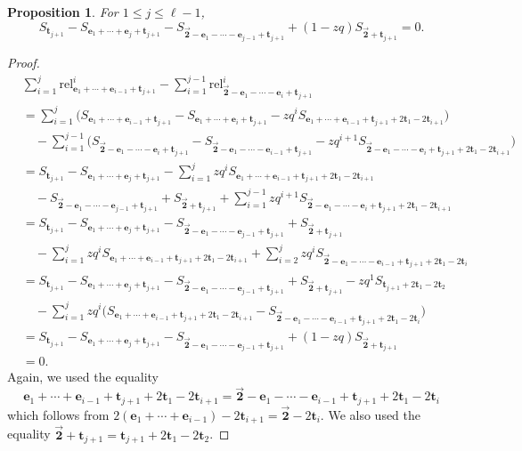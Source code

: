 \documentclass[pdftex]{sigma}
\numberwithin{equation}{section}
\newtheorem{Proposition}[Theorem]{Proposition}
\theoremstyle{definition}
\newcommand{\rel}{\text{rel}}
\newcommand{\tr}{\mathbf{t}}
\newcommand{\ee}{\mathbf{e}}
\newcommand{\two}{\vec{\mathbf{2}}}
\begin{document}
\begin{Proposition} \label{prop:comp2}
For $1 \le j \le \ell-1$,
\begin{equation*}
S_{\tr_{j+1}} -S_{\ee_1+\cdots+\ee_{j}+\tr_{j+1}}- S_{\two-\ee_1-\cdots-\ee_{j-1}+\tr_{j+1}} + (1-zq)S_{\two+\tr_{j+1}}=0.
\end{equation*}
\end{Proposition}
\begin{proof}
\begin{align*}
&\sum_{i=1}^j \rel^i_{\ee_1+\cdots+\ee_{i-1}+\tr_{j+1}} - \sum_{i=1}^{j-1}\rel^i_{\two-\ee_1-\cdots-\ee_i+\tr_{j+1}} \\
&=\sum_{i=1}^j \bigl( S_{\ee_1+\cdots+\ee_{i-1}+\tr_{j+1}} - S_{\ee_1+\cdots+\ee_{i}+\tr_{j+1}} - zq^{i} S_{\ee_1+\cdots+\ee_{i-1}+\tr_{j+1}+2\tr_1-2\tr_{i+1}}\bigr) \\
& \quad - \sum_{i=1}^{j-1}\bigl( S_{\two-\ee_1-\cdots-\ee_i+\tr_{j+1}} - S_{\two-\ee_1-\cdots-\ee_{i-1}+\tr_{j+1}} - zq^{i+1} S_{\two-\ee_1-\cdots-\ee_i+\tr_{j+1}+2\tr_1-2\tr_{i+1}}\bigr) \\
&=S_{\tr_{j+1}} -S_{\ee_1+\cdots+\ee_{j}+\tr_{j+1}} - \sum_{i=1}^j zq^{i} S_{\ee_1+\cdots+\ee_{i-1}+\tr_{j+1}+2\tr_1-2\tr_{i+1}} \\
& \quad - S_{\two-\ee_1-\cdots-\ee_{j-1}+\tr_{j+1}} + S_{\two+\tr_{j+1}} +\sum_{i=1}^{j-1}zq^{i+1} S_{\two-\ee_1-\cdots-\ee_i+\tr_{j+1}+2\tr_1-2\tr_{i+1}}
\\
&=S_{\tr_{j+1}} -S_{\ee_1+\cdots+\ee_{j}+\tr_{j+1}}- S_{\two-\ee_1-\cdots-\ee_{j-1}+\tr_{j+1}} + S_{\two+\tr_{j+1}} \\
& \quad - \sum_{i=1}^j zq^{i} S_{\ee_1+\cdots+\ee_{i-1}+\tr_{j+1}+2\tr_1-2\tr_{i+1}} +\sum_{i=2}^{j}zq^{i} S_{\two-\ee_1-\cdots-\ee_{i-1}+\tr_{j+1}+2\tr_1-2\tr_{i}} \\
&=S_{\tr_{j+1}} -S_{\ee_1+\cdots+\ee_{j}+\tr_{j+1}}- S_{\two-\ee_1-\cdots-\ee_{j-1}+\tr_{j+1}} + S_{\two+\tr_{j+1}} - zq^{1} S_{\tr_{j+1}+2\tr_1-2\tr_{2}} \\
& \quad - \sum_{i=1}^j zq^{i} \bigl( S_{\ee_1+\cdots+\ee_{i-1}+\tr_{j+1}+2\tr_1-2\tr_{i+1}} - S_{\two-\ee_1-\cdots-\ee_{i-1}+\tr_{j+1}+2\tr_1-2\tr_{i}}\bigr) \\
&=S_{\tr_{j+1}} -S_{\ee_1+\cdots+\ee_{j}+\tr_{j+1}}- S_{\two-\ee_1-\cdots-\ee_{j-1}+\tr_{j+1}} + (1-zq)S_{\two+\tr_{j+1}} \\
&=0.
\end{align*}
Again, we used the equality
\begin{equation*}
\ee_1+\cdots+\ee_{i-1}+\tr_{j+1}+2\tr_1-2\tr_{i+1}=
\two-\ee_1-\cdots-\ee_{i-1}+\tr_{j+1}+2\tr_1-2\tr_{i}
\end{equation*}
which follows from $2(\ee_1+\cdots+\ee_{i-1})-2\tr_{i+1} =\two-2\tr_{i}.$ We also used the equality $\two+\tr_{j+1} ={\tr_{j+1}+2\tr_1-2\tr_{2}}$.
\end{proof}
\end{document}
